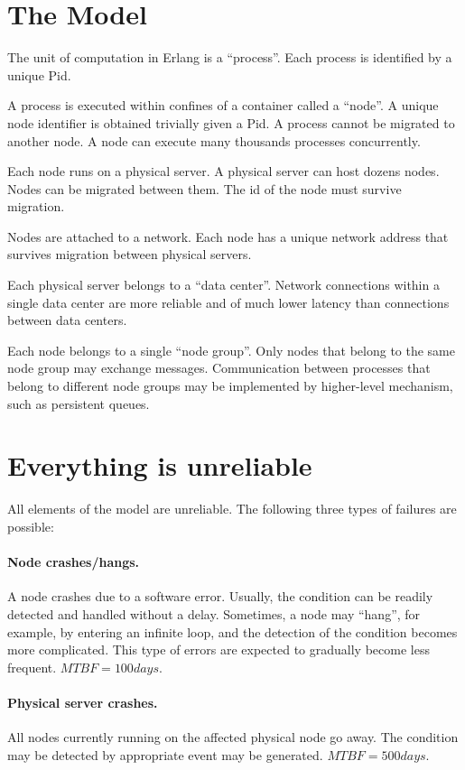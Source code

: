 \documentclass{scrartcl}
\begin{document}
\section*{The Model}

The unit of computation in Erlang is a ``process''. Each process is identified
by a unique Pid.

A process is executed within confines of a container called a ``node''. A unique
node identifier is obtained trivially given a Pid. A process cannot be migrated
to another node. A node can execute many thousands processes concurrently.

Each node runs on a physical server. A physical server can host dozens nodes.
Nodes can be migrated between them. The id of the node must survive migration.

Nodes are attached to a network. Each node has a unique network address that
survives migration between physical servers.

Each physical server belongs to a ``data center''. Network connections within a
single data center are more reliable and of much lower latency than connections
between data centers.

Each node belongs to a single ``node group''. Only nodes that belong to the same
node group may exchange messages. Communication between processes that belong to
different node groups may be implemented by higher-level mechanism, such as
persistent queues.

\section*{Everything is unreliable}

All elements of the model are unreliable. The following three types of failures are
possible:

\paragraph{Node crashes/hangs.} A node crashes due to a software error. Usually,
the condition can be readily detected and handled without a delay. Sometimes,
a node may ``hang'', for example, by entering an infinite loop, and the
detection of the condition becomes more complicated. This type of errors are
expected to gradually become less frequent. $MTBF = 100 days$.

\paragraph{Physical server crashes.} All nodes currently running on the affected
physical node go away. The condition may be detected by appropriate event may be
generated. $MTBF = 500 days$.
\end{document}
